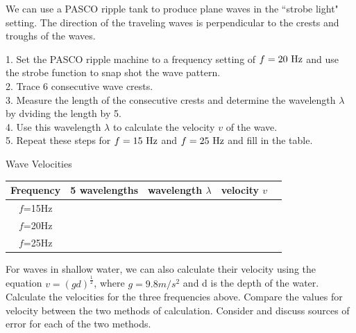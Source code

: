 \documentclass[11pt]{NSF}
\begin{document}
We can use a PASCO ripple tank to produce plane waves in the ``strobe
light" setting.
The direction of the traveling waves is perpendicular to the 
crests and troughs of the waves.

1. Set the PASCO ripple machine to a frequency setting of $f=20~{\rm Hz}$ and use the strobe function to snap shot the wave pattern. \\
2. Trace 6 consecutive wave crests. \\
3. Measure the length of the consecutive crests and determine the wavelength $\lambda$ by dviding the length by 5. \\
4. Use this wavelength $\lambda$ to calculate the velocity $v$ of the wave. \\
5. Repeat these steps for  $f=15~{\rm Hz}$ and  $f=25~{\rm Hz}$ and fill in the table. \\
%
\begin{table}[hbtp]
\begin{center}
Wave Velocities\\
\begin{tabular}{| c | c | c | c | c | }
\hline
Frequency & \phantom{ }5 wavelengths\phantom{ } & wavelength $\lambda$ & \phantom{ }velocity $v$\phantom{ } \\
\hline
$f$=15Hz &  &  &  \\
\hline
$f$=20Hz  &  &  &  \\
\hline
$f$=25Hz  &  &  &  \\
\hline
\end{tabular}
\label{t:1}
\end{center}
\end{table}

For waves in shallow water, we can also calculate their velocity using the equation $v = (gd)^\frac{1}{2} $, where $ g = 9.8 m/s^{2}$ and d is the depth of the water. Calculate the velocities for the three frequencies above. Compare the values for velocity between the two methods of calculation. Consider and discuss sources of error for each of the two methods. 

\end{document}
